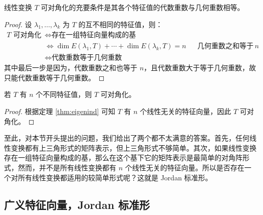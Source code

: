 \begin{corollary}
\label{cor:diag}
线性变换 $T$ 可对角化的充要条件是其各个特征值的代数重数与几何重数相等。
\end{corollary}
\begin{proof}
设 $\lambda_1,\ldots,\lambda_k$ 为 $T$ 的互不相同的特征值，则：
\begin{align*}
    T\text{ 可对角化}&\iff \text{存在一组特征向量构成的基}\\
    &\iff \dim E(\lambda_1,T)+\cdots+\dim E(\lambda_k,T)=n&&\text{几何重数之和等于}\,n\\
    &\iff \text{代数重数等于几何重数}
\end{align*}
其中最后一步是因为，代数重数之和也等于 $n$，且代数重数大于等于几何重数，故只能代数重数等于几何重数。
\end{proof}

\begin{corollary}[可对角化的充分条件]
若 $T$ 有 $n$ 个不同特征值，则 $T$ 可对角化。
\end{corollary}
\begin{proof}
根据定理 \ref{thm:eigenind} 可知 $T$ 有 $n$ 个线性无关的特征向量，因此 $T$ 可对角化。
\end{proof}

至此，对本节开头提出的问题，我们给出了两个都不太满意的答案。首先，任何线性变换都有上三角形式的矩阵表示，但上三角形式不够简单。其次，如果线性变换存在一组特征向量构成的基，那么在这个基下它的矩阵表示是最简单的对角阵形式，然而，并不是所有线性变换都有 $n$ 个线性无关的特征向量。所以是否存在一个对所有线性变换都适用的较简单形式呢？这就是 Jordan 标准形。


\subsection{广义特征向量，Jordan 标准形}
\label{sec:jordan}


